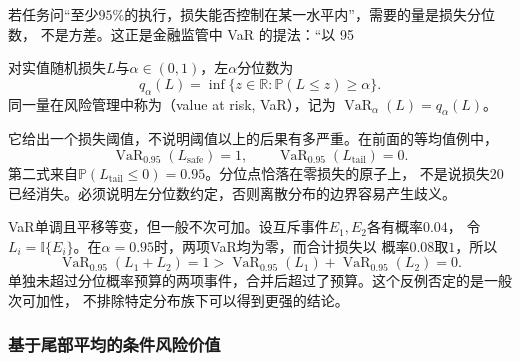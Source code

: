 若任务问“至少$95\%$的执行，损失能否控制在某一水平内”，需要的量是损失分位数，
不是方差。这正是金融监管中 VaR 的提法：“以 95%
\begin{definition}[风险价值]
\label{def:decision-value-at-risk}
对实值随机损失$L$与$\alpha\in(0,1)$，左$\alpha$分位数为
\begin{equation}
  q_\alpha(L)=\inf\{z\in\mathbb R:\mathbb P(L\leq z)\geq\alpha\}.
  \label{eq:decision-loss-quantile}
\end{equation}
同一量在风险管理中称为（value at risk, VaR），记为
$\operatorname{VaR}_\alpha(L)=q_\alpha(L)$。
\end{definition}
它给出一个损失阈值，不说明阈值以上的后果有多严重。在前面的等均值例中，
\[
  \operatorname{VaR}_{0.95}(L_{\mathrm{safe}})=1,\qquad
  \operatorname{VaR}_{0.95}(L_{\mathrm{tail}})=0.
\]
第二式来自$\mathbb P(L_{\mathrm{tail}}\leq0)=0.95$。分位点恰落在零损失的原子上，
不是说损失$20$已经消失。必须说明左分位数约定，否则离散分布的边界容易产生歧义。

VaR单调且平移等变，但一般不次可加。设互斥事件$E_1,E_2$各有概率$0.04$，
令$L_i=\mathbb I\{E_i\}$。在$\alpha=0.95$时，两项VaR均为零，而合计损失以
概率$0.08$取$1$，所以
\[
  \operatorname{VaR}_{0.95}(L_1+L_2)=1
  >\operatorname{VaR}_{0.95}(L_1)+\operatorname{VaR}_{0.95}(L_2)=0.
\]
单独未超过分位概率预算的两项事件，合并后超过了预算。这个反例否定的是一般次可加性，
不排除特定分布族下可以得到更强的结论。

\subsubsection{基于尾部平均的条件风险价值}

